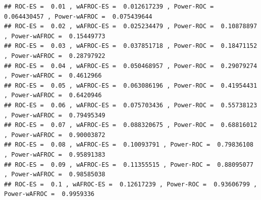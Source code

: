 \documentclass[
]{book}
\newenvironment{Shaded}{\begin{snugshade}}{\end{snugshade}}
\newcommand{\AttributeTok}[1]{\textcolor[rgb]{0.77,0.63,0.00}{#1}}
\newcommand{\CommentTok}[1]{\textcolor[rgb]{0.56,0.35,0.01}{\textit{#1}}}
\newcommand{\ConstantTok}[1]{\textcolor[rgb]{0.00,0.00,0.00}{#1}}
\newcommand{\FunctionTok}[1]{\textcolor[rgb]{0.00,0.00,0.00}{#1}}
\newcommand{\NormalTok}[1]{#1}
\newcommand{\OtherTok}[1]{\textcolor[rgb]{0.56,0.35,0.01}{#1}}
\newcommand{\SpecialCharTok}[1]{\textcolor[rgb]{0.00,0.00,0.00}{#1}}
\newcommand{\StringTok}[1]{\textcolor[rgb]{0.31,0.60,0.02}{#1}}
\begin{document}
\begin{Shaded}
\end{Shaded}

\begin{verbatim}
## ROC-ES =  0.01 , wAFROC-ES =  0.012617239 , Power-ROC =  0.064430457 , Power-wAFROC =  0.075439644 
## ROC-ES =  0.02 , wAFROC-ES =  0.025234479 , Power-ROC =  0.10878897 , Power-wAFROC =  0.15449773 
## ROC-ES =  0.03 , wAFROC-ES =  0.037851718 , Power-ROC =  0.18471152 , Power-wAFROC =  0.28797922 
## ROC-ES =  0.04 , wAFROC-ES =  0.050468957 , Power-ROC =  0.29079274 , Power-wAFROC =  0.4612966 
## ROC-ES =  0.05 , wAFROC-ES =  0.063086196 , Power-ROC =  0.41954431 , Power-wAFROC =  0.6420946 
## ROC-ES =  0.06 , wAFROC-ES =  0.075703436 , Power-ROC =  0.55738123 , Power-wAFROC =  0.79495349 
## ROC-ES =  0.07 , wAFROC-ES =  0.088320675 , Power-ROC =  0.68816012 , Power-wAFROC =  0.90003872 
## ROC-ES =  0.08 , wAFROC-ES =  0.10093791 , Power-ROC =  0.79836108 , Power-wAFROC =  0.95891383 
## ROC-ES =  0.09 , wAFROC-ES =  0.11355515 , Power-ROC =  0.88095077 , Power-wAFROC =  0.98585038 
## ROC-ES =  0.1 , wAFROC-ES =  0.12617239 , Power-ROC =  0.93606799 , Power-wAFROC =  0.9959336
\end{verbatim}
\end{document}
